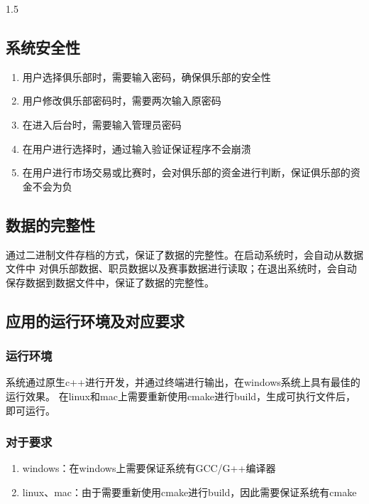\documentclass[a4paper]{article}
\begin{document}
\begin{spacing}{1.5}
\begin{enumerate}
        \end{enumerate}

        \subsection{系统安全性}
        \begin{enumerate}
            \item 用户选择俱乐部时，需要输入密码，确保俱乐部的安全性
            \item 用户修改俱乐部密码时，需要两次输入原密码
            \item 在进入后台时，需要输入管理员密码
            \item 在用户进行选择时，通过输入验证保证程序不会崩溃
            \item 在用户进行市场交易或比赛时，会对俱乐部的资金进行判断，保证俱乐部的资金不会为负
        \end{enumerate}
            
        \subsection{数据的完整性}
            通过二进制文件存档的方式，保证了数据的完整性。在启动系统时，会自动从数据文件中
            对俱乐部数据、职员数据以及赛事数据进行读取；在退出系统时，会自动保存数据到数据文件中，保证了数据的完整性。

        \subsection{应用的运行环境及对应要求}

        \subsubsection{运行环境}
            系统通过原生c++进行开发，并通过终端进行输出，在windows系统上具有最佳的运行效果。
            在linux和mac上需要重新使用cmake进行build，生成可执行文件后，即可运行。

        \subsubsection{对于要求}
            \begin{enumerate}
                \item windows：在windows上需要保证系统有GCC/G++编译器
                \item linux、mac：由于需要重新使用cmake进行build，因此需要保证系统有cmake
            \end{enumerate}


\end{spacing}
\end{document}
